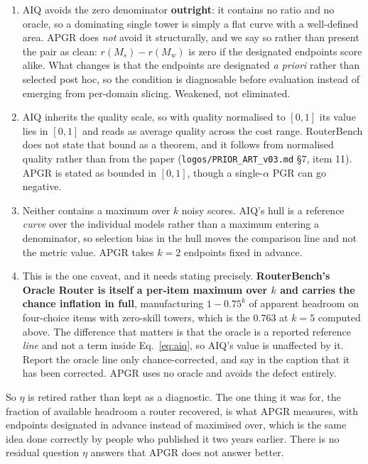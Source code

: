 \documentclass[11pt]{article}
\begin{document}
\begin{enumerate}[label=(E\arabic*),itemsep=3pt]
\item AIQ avoids the zero denominator \textbf{outright}: it contains no ratio and no oracle, so a dominating single tower is simply a flat curve with a well-defined area. APGR does \emph{not} avoid it structurally, and we say so rather than present the pair as clean: $r(M_s) - r(M_w)$ is zero if the designated endpoints score alike. What changes is that the endpoints are designated \emph{a priori} rather than selected post hoc, so the condition is diagnosable before evaluation instead of emerging from per-domain slicing. Weakened, not eliminated.
\item AIQ inherits the quality scale, so with quality normalised to $[0,1]$ its value lies in $[0,1]$ and reads as average quality across the cost range. RouterBench does not state that bound as a theorem, and it follows from normalised quality rather than from the paper (\texttt{logos/PRIOR\_ART\_v03.md} \S7, item 11). APGR is stated as bounded in $[0,1]$, though a single-$\alpha$ PGR can go negative.
\item Neither contains a maximum over $k$ noisy scores. AIQ's hull is a reference \emph{curve} over the individual models rather than a maximum entering a denominator, so selection bias in the hull moves the comparison line and not the metric value. APGR takes $k=2$ endpoints fixed in advance.
\item This is the one caveat, and it needs stating precisely. \textbf{RouterBench's Oracle Router is itself a per-item maximum over $k$ and carries the chance inflation in full}, manufacturing $1-0.75^k$ of apparent headroom on four-choice items with zero-skill towers, which is the $0.763$ at $k=5$ computed above. The difference that matters is that the oracle is a reported reference \emph{line} and not a term inside Eq.~\eqref{eq:aiq}, so AIQ's value is unaffected by it. Report the oracle line only chance-corrected, and say in the caption that it has been corrected. APGR uses no oracle and avoids the defect entirely.
\end{enumerate}

So $\eta$ is retired rather than kept as a diagnostic. The one thing it was for, the fraction of available headroom a router recovered, is what APGR measures, with endpoints designated in advance instead of maximised over, which is the same idea done correctly by people who published it two years earlier. There is no residual question $\eta$ answers that APGR does not answer better.
\end{document}
